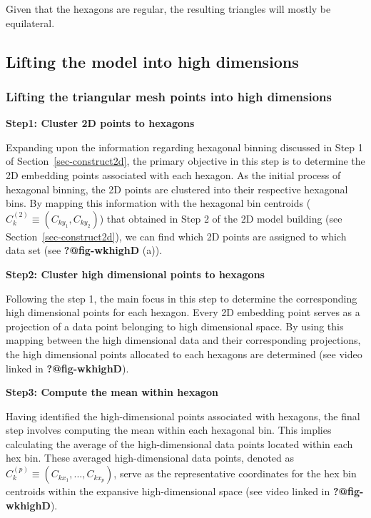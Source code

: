 \documentclass[
  12pt]{article}
\begin{document}
Given that the hexagons are regular, the resulting triangles will mostly
be equilateral.

\hypertarget{lifting-the-model-into-high-dimensions}{%
\subsection{Lifting the model into high
dimensions}\label{lifting-the-model-into-high-dimensions}}

\hypertarget{lifting-the-triangular-mesh-points-into-high-dimensions}{%
\subsubsection{Lifting the triangular mesh points into high
dimensions}\label{lifting-the-triangular-mesh-points-into-high-dimensions}}

\textbf{Step1: Cluster 2D points to hexagons}

Expanding upon the information regarding hexagonal binning discussed in
Step 1 of Section~\ref{sec-construct2d}, the primary objective in this
step is to determine the 2D embedding points associated with each
hexagon. As the initial process of hexagonal binning, the 2D points are
clustered into their respective hexagonal bins. By mapping this
information with the hexagonal bin centroids
(\(C_k^{(2)} \equiv (C_{ky_1}, C_{ky_2})\)) that obtained in Step 2 of
the 2D model building (see Section~\ref{sec-construct2d}), we can find
which 2D points are assigned to which data set (see
\textbf{?@fig-wkhighD} (a)).

\textbf{Step2: Cluster high dimensional points to hexagons}

Following the step 1, the main focus in this step to determine the
corresponding high dimensional points for each hexagon. Every 2D
embedding point serves as a projection of a data point belonging to high
dimensional space. By using this mapping between the high dimensional
data and their corresponding projections, the high dimensional points
allocated to each hexagons are determined (see video linked in
\textbf{?@fig-wkhighD}).

\textbf{Step3: Compute the mean within hexagon}

Having identified the high-dimensional points associated with hexagons,
the final step involves computing the mean within each hexagonal bin.
This implies calculating the average of the high-dimensional data points
located within each hex bin. These averaged high-dimensional data
points, denoted as \(C_k^{(p)} \equiv (C_{kx_1}, ..., C_{kx_p})\), serve
as the representative coordinates for the hex bin centroids within the
expansive high-dimensional space (see video linked in
\textbf{?@fig-wkhighD}).
\end{document}
